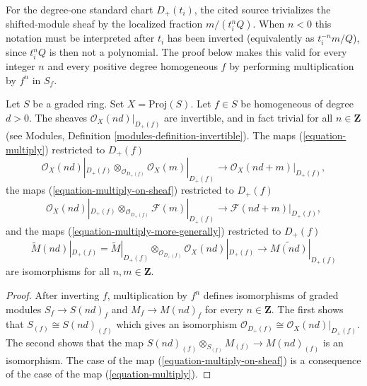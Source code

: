 \begin{lemma}
\label{lemma-when-invertible}
\begin{reference}
\cite[Chapter III, \S 2, no. 58, Proposition 4, p. 250]{FAC}
\end{reference}
\begin{history}
For the degree-one standard chart $D_{+}(t_i)$, the cited source trivializes
the shifted-module sheaf by the localized fraction $m/(t_i^nQ)$. When
$n < 0$ this notation must be interpreted after $t_i$ has been inverted
(equivalently as $t_i^{-n}m/Q$), since $t_i^nQ$ is then not a polynomial.
The proof below makes this valid for every integer $n$ and every positive
degree homogeneous $f$ by performing multiplication by $f^n$ in $S_f$.
\end{history}
Let $S$ be a graded ring. Set $X = \text{Proj}(S)$.
Let $f \in S$ be homogeneous of degree $d > 0$.
The sheaves $\mathcal{O}_X(nd)|_{D_{+}(f)}$ are invertible,
and in fact trivial for all $n \in \mathbf{Z}$
(see Modules, Definition \ref{modules-definition-invertible}).
The maps (\ref{equation-multiply}) restricted to $D_{+}(f)$
$$
\mathcal{O}_X(nd)|_{D_{+}(f)} \otimes_{\mathcal{O}_{D_{+}(f)}}
\mathcal{O}_X(m)|_{D_{+}(f)}
\longrightarrow
\mathcal{O}_X(nd + m)|_{D_{+}(f)},
$$
the maps (\ref{equation-multiply-on-sheaf}) restricted to $D_+(f)$
$$
\mathcal{O}_X(nd)|_{D_{+}(f)} \otimes_{\mathcal{O}_{D_{+}(f)}}
\mathcal{F}(m)|_{D_{+}(f)}
\longrightarrow
\mathcal{F}(nd + m)|_{D_{+}(f)},
$$
and the maps (\ref{equation-multiply-more-generally})
restricted to $D_{+}(f)$
$$
\widetilde M(nd)|_{D_{+}(f)}
=
\widetilde M|_{D_{+}(f)}
\otimes_{\mathcal{O}_{D_{+}(f)}}
\mathcal{O}_X(nd)|_{D_{+}(f)}
\longrightarrow
\widetilde{M(nd)}|_{D_{+}(f)}
$$
are isomorphisms for all $n, m \in \mathbf{Z}$.
\end{lemma}

\begin{proof}
After inverting $f$, multiplication by $f^n$ defines isomorphisms of
graded modules $S_f \to S(nd)_f$ and $M_f \to M(nd)_f$ for every
$n \in \mathbf{Z}$. The first shows that
$S_{(f)} \cong S(nd)_{(f)}$ which gives an isomorphism
$\mathcal{O}_{D_{+}(f)} \cong \mathcal{O}_X(nd)|_{D_{+}(f)}$.
The second shows that the map
$S(nd)_{(f)} \otimes_{S_{(f)}} M_{(f)} \to M(nd)_{(f)}$
is an isomorphism. The case of the map (\ref{equation-multiply-on-sheaf})
is a consequence of the case of the map (\ref{equation-multiply}).
\end{proof}

